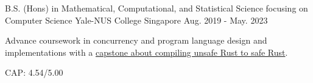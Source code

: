 

\begin{cventries}

  \cventry
    {B.S. (Hons) in Mathematical, Computational, and Statistical Science focusing on Computer Science} %
    {Yale-NUS College} %
    {Singapore} %
    {Aug. 2019 - May. 2023} %
    {
      \begin{cvitems} %
        \item {Advance coursework in concurrency and program language design and implementations with a \href{https://www.google.com}{capstone about compiling unsafe Rust to safe Rust}.}  
        \item {CAP: 4.54/5.00}
      \end{cvitems}
    }

\end{cventries}
